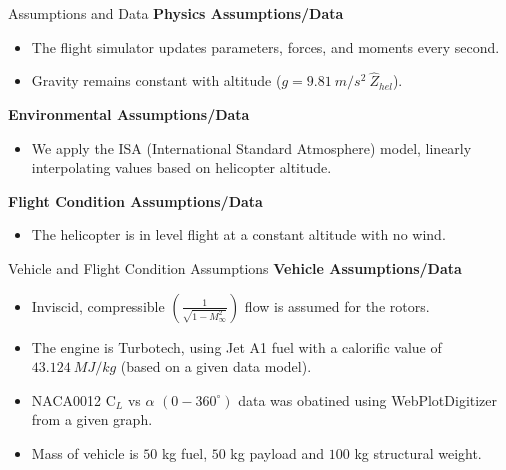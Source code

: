 
\begin{frame}{Assumptions and Data}
\textbf{Physics Assumptions/Data}
\begin{itemize}
  \item The flight simulator updates parameters, forces, and moments every second.
  \item Gravity remains constant with altitude ($g = 9.81 \ m/s^2 \ \widehat{Z}_{hel}$).
\end{itemize}

\textbf{Environmental Assumptions/Data}
\begin{itemize}
  \item We apply the ISA (International Standard Atmosphere) model, linearly interpolating values based on helicopter altitude.
\end{itemize}

\textbf{Flight Condition Assumptions/Data}
\begin{itemize}
  \item The helicopter is in level flight at a constant altitude with no wind.
\end{itemize}
\end{frame}

\begin{frame}{Vehicle and Flight Condition Assumptions}
\textbf{Vehicle Assumptions/Data}
\begin{itemize}
  \item Inviscid, compressible $\left(\frac{1}{\sqrt{1-M_{\infty}^2}}\right)$ flow is assumed for the rotors.
  \item The engine is Turbotech, using Jet A1 fuel with a calorific value of $43.124 \ MJ/kg$ (based on a given data model).
  \item NACA0012 C$_{L}$ vs $\alpha$ $(0-360^\circ)$ data was obatined using WebPlotDigitizer from a given graph.
  \item Mass of vehicle is $50$ kg fuel, $50$ kg payload and $100$ kg structural weight.
\end{itemize}
\end{frame}
